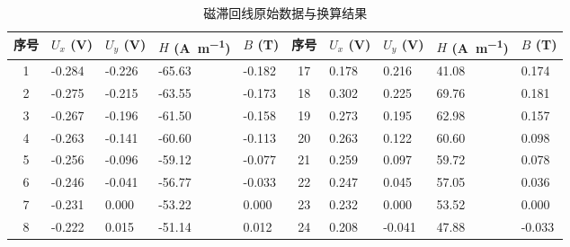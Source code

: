 \documentclass{../template/Report}%
\begin{document}
\begin{fullreportonly}
    \begin{table}[H]
        \centering
        \caption{磁滞回线原始数据与换算结果}
        \label{tab:hysteresis_data}
        \scriptsize
        \setlength{\tabcolsep}{2pt} %
        \begin{tabularx}{\textwidth}{cXXXX|cXXXX}
            \toprule
            序号 & $U_x$ (\unit{\volt}) & $U_y$ (\unit{\volt}) & $H$ (\unit{\ampere\per\meter}) & $B$ (\unit{\tesla}) & 序号 & $U_x$ (\unit{\volt}) & $U_y$ (\unit{\volt}) & $H$ (\unit{\ampere\per\meter}) & $B$ (\unit{\tesla}) \\
            \midrule
            1  & -0.284               & -0.226               & -65.63                         & -0.182              & 17 & 0.178                & 0.216                & 41.08                          & 0.174               \\
            2  & -0.275               & -0.215               & -63.55                         & -0.173              & 18 & 0.302                & 0.225                & 69.76                          & 0.181               \\
            3  & -0.267               & -0.196               & -61.50                         & -0.158              & 19 & 0.273                & 0.195                & 62.98                          & 0.157               \\
            4  & -0.263               & -0.141               & -60.60                         & -0.113              & 20 & 0.263                & 0.122                & 60.60                          & 0.098               \\
            5  & -0.256               & -0.096               & -59.12                         & -0.077              & 21 & 0.259                & 0.097                & 59.72                          & 0.078               \\
            6  & -0.246               & -0.041               & -56.77                         & -0.033              & 22 & 0.247                & 0.045                & 57.05                          & 0.036               \\
            7  & -0.231               & 0.000                & -53.22                         & 0.000               & 23 & 0.232                & 0.000                & 53.52                          & 0.000               \\
            8  & -0.222               & 0.015                & -51.14                         & 0.012               & 24 & 0.208                & -0.041               & 47.88                          & -0.033              \\

\end{tabularx}
\end{table}
\end{fullreportonly}
\end{document}
